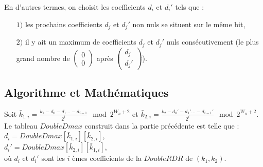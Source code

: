 \documentclass[12pt, a4paper]{memoir}
\newcommand{\doublezero}{\begin{pmatrix} 0 \\ 0 \end{pmatrix}}
\begin{document}
  \begin{Remarque}
   En d'autres termes, on choisit les coefficients $d_i$ et $d_i'$ tels que :
   \begin{itemize}
    \item [$1)$] les prochains coefficients $d_j$ et $d_j'$ non nuls se situent sur le même bit,
    \item [$2)$] il y ait un maximum de coefficients $d_j$ et $d_j'$ nuls consécutivement (le plus grand 
    nombre de $\doublezero$ après $\begin{pmatrix} d_j \\ d_j' \end{pmatrix}$).
   \end{itemize}
  \end{Remarque}

  \subsection{Algorithme et Mathématiques}

  \begin{Proposition}
  Soit $\bar{k}_{1,i} = \frac{k_1-d_0-d_1 \ldots -d_{i-1}}{2^i} \mod 2^{W_n+2}$ et $\bar{k}_{2,i} = \frac{k_2-d_0'-d_1' \ldots -d_{i-1}'}{2^i} \mod 2^{W_n+2}$. \\
  
  Le tableau $DoubleDmax$ construit dans la partie précédente est telle que : \\
  $d_i = DoubleDmax[\bar{k}_{1,i}][\bar{k}_{2,i}]$, \\
  $d_i' = DoubleDmax[\bar{k}_{2,i}][\bar{k}_{1,i}]$, \\
  où $d_i$ et $d_i'$ sont les $i$ èmes coefficients de la $DoubleRDR$ de $(k_1,k_2)$.
  \end{Proposition}
\end{document}
